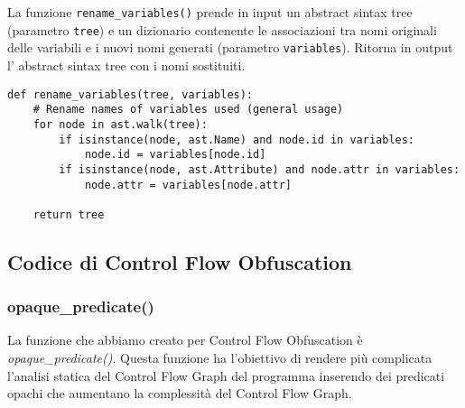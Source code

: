 \documentclass[a4paper,oneside,openright,titlepage,10pt,footinclude,headinclude]{scrbook}
\begin{document}
La funzione \texttt{rename\_variables()} prende in input un abstract sintax tree (parametro \texttt{tree}) e un dizionario contenente le associazioni tra nomi originali delle variabili  e i nuovi nomi generati (parametro \texttt{variables}). Ritorna in output l' abstract sintax tree con i nomi sostituiti.
\begin{graybox}[innerleftmargin=2,]
\begin{lstlisting}
def rename_variables(tree, variables):
    # Rename names of variables used (general usage)
    for node in ast.walk(tree):
        if isinstance(node, ast.Name) and node.id in variables:
            node.id = variables[node.id]
        if isinstance(node, ast.Attribute) and node.attr in variables:
            node.attr = variables[node.attr]

    return tree
\end{lstlisting}
\end{graybox}


\subsection{Codice di Control Flow Obfuscation}

\subsubsection{opaque\_predicate()}
La funzione che abbiamo creato per Control Flow Obfuscation è \textit{opaque\_predicate()}. Questa funzione ha l'obiettivo di rendere più complicata l'analisi statica del Control Flow Graph del programma inserendo dei predicati opachi che aumentano la complessità del Control Flow Graph.
\end{document}
